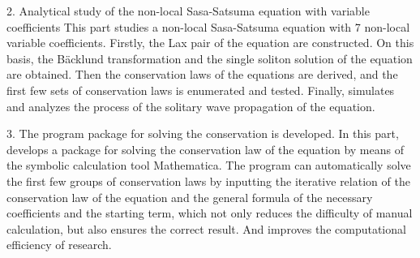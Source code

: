 \begin{eabstract}
2. Analytical study of the non-local Sasa-Satsuma equation with variable coefficients
This part studies a non-local Sasa-Satsuma equation with 7 non-local variable coefficients. Firstly, the Lax pair of the equation are constructed. On this basis, the B\"{a}cklund transformation and the single soliton solution of the equation are obtained. Then the conservation laws of the equations are derived, and the first few sets of conservation laws is enumerated and tested. Finally, simulates and analyzes the process of the solitary wave propagation of the equation.

3. The program package for solving the conservation is developed.
In this part, develops a package for solving the conservation law of the equation by means of the symbolic calculation tool Mathematica. The program can automatically solve the first few groups of conservation laws by inputting the iterative relation of the conservation law of the equation and the general formula of the necessary coefficients and the starting term, which not only reduces the difficulty of manual calculation, but also ensures the correct result. And improves the computational efficiency of research.

\end{eabstract}

